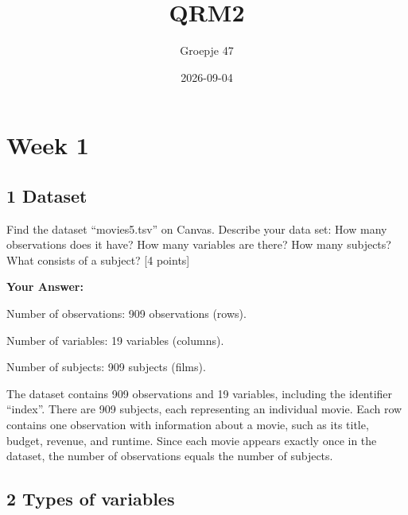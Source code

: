 \documentclass[
]{article}
\title{QRM2}
\author{Groepje 47}
\date{2026-09-04}
\newenvironment{Shaded}{\begin{snugshade}}{\end{snugshade}}
\newcommand{\CommentTok}[1]{\textcolor[rgb]{0.56,0.35,0.01}{\textit{#1}}}
\newcommand{\DocumentationTok}[1]{\textcolor[rgb]{0.56,0.35,0.01}{\textbf{\textit{#1}}}}
\newcommand{\FunctionTok}[1]{\textcolor[rgb]{0.13,0.29,0.53}{\textbf{#1}}}
\newcommand{\NormalTok}[1]{#1}
\newcommand{\OtherTok}[1]{\textcolor[rgb]{0.56,0.35,0.01}{#1}}
\newcommand{\SpecialCharTok}[1]{\textcolor[rgb]{0.81,0.36,0.00}{\textbf{#1}}}
\newcommand{\StringTok}[1]{\textcolor[rgb]{0.31,0.60,0.02}{#1}}
\begin{document}
\maketitle

\section{Week 1}\label{week-1}

\subsection{1 Dataset}\label{dataset}

Find the dataset ``movies5.tsv'' on Canvas. Describe your data set: How
many observations does it have? How many variables are there? How many
subjects? What consists of a subject? {[}4 points{]}

\begin{Shaded}
\end{Shaded}

\textbf{Your Answer:}

Number of observations: 909 observations (rows).

Number of variables: 19 variables (columns).

Number of subjects: 909 subjects (films).

The dataset contains 909 observations and 19 variables, including the
identifier ``index''. There are 909 subjects, each representing an
individual movie. Each row contains one observation with information
about a movie, such as its title, budget, revenue, and runtime. Since
each movie appears exactly once in the dataset, the number of
observations equals the number of subjects.

\subsection{2 Types of variables}\label{types-of-variables}
\end{document}
